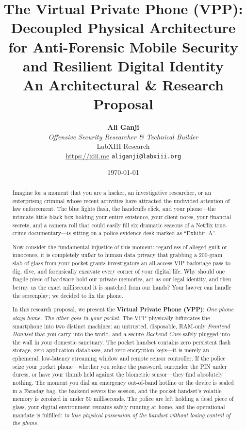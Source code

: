 \documentclass[11pt,a4paper]{article}
\title{\textbf{The Virtual Private Phone (VPP):\\Decoupled Physical Architecture for Anti-Forensic Mobile Security and Resilient Digital Identity}\\[0.5em]\large An Architectural \& Research Proposal}
\author{
    \textbf{Ali Ganji}\\
    \textit{Offensive Security Researcher \& Technical Builder}\\
    LabXIII Research\\
    \url{https://xiii.me} \quad \textbullet \quad \texttt{aliganji@labxiii.org}
}
\date{\today}
\begin{document}
\maketitle

\begin{abstract}
Imagine for a moment that you are a hacker, an investigative researcher, or an enterprising criminal whose recent activities have attracted the undivided attention of law enforcement. The blue lights flash, the handcuffs click, and your phone—the intimate little black box holding your entire existence, your client notes, your financial secrets, and a camera roll that could easily fill six dramatic seasons of a Netflix true-crime documentary—is sitting on a police evidence desk marked as ``Exhibit~A''. 

Now consider the fundamental injustice of this moment: regardless of alleged guilt or innocence, it is completely unfair to human data privacy that grabbing a 200-gram slab of glass from your pocket grants investigators an all-access VIP backstage pass to dig, dive, and forensically excavate every corner of your digital life. Why should one fragile piece of hardware hold our private memories, act as our legal identity, and then betray us the exact millisecond it is snatched from our hands? Your lawyer can handle the screenplay; we decided to fix the phone.

In this research proposal, we present the \textbf{Virtual Private Phone (VPP)}: \textit{One phone stays home. The other goes in your pocket.} The VPP physically bifurcates the smartphone into two distinct machines: an untrusted, disposable, RAM-only \textit{Frontend Handset} that you carry into the world, and a secure \textit{Backend Core} safely plugged into the wall in your domestic sanctuary. The pocket handset contains zero persistent flash storage, zero application databases, and zero encryption keys—it is merely an ephemeral, low-latency streaming window and remote sensor controller. If the police seize your pocket phone—whether you refuse the password, surrender the PIN under duress, or have your thumb held against the biometric sensor—they find absolutely nothing. The moment you dial an emergency out-of-band hotline or the device is sealed in a Faraday bag, the backend severs the session, and the pocket handset's volatile memory is zeroized in under 50 milliseconds. The police are left holding a dead piece of glass, your digital environment remains safely running at home, and the operational mandate is fulfilled: \textit{to lose physical possession of the handset without losing control of the phone.}
\end{abstract}
\end{document}
